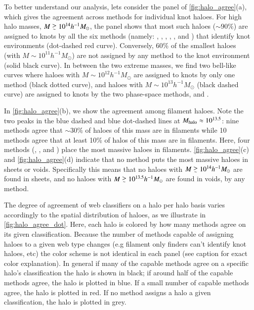 To better understand our analysis, lets consider the panel of \autoref{fig:halo_agree}(a), which gives the agreement across methods for individual knot haloes. For high halo masses, $M\gsim10^{14}h^{-1}M_{\odot}$, the panel shows that most such haloes ($\sim90\%$) are assigned to knots by all the six methods (namely: \nexus{}, \tweb{}, \vweb{}, \classic{}, \origami{}, and \mswa{}) that identify knot environments (dot-dashed red curve). Conversely, 60\% of the smallest haloes (with $M\sim10^{11}h^{-1}M_{\odot}$) are not assigned by any method to the knot environment (solid black curve). In between the two extreme masses, we find two bell-like curves where haloes with $M\sim10^{12}h^{-1}M_{\odot}$ are assigned to knots by only one method (black dotted curve), and haloes with $M\sim10^{13}h^{-1}M_{\odot}$ (black dashed curve) are assigned to knots by the two phase-space methods, \mswa{} and \origami{}.

In \autoref{fig:halo_agree}(b), we show the agreement among filament haloes. Note the two peaks in the blue dashed and blue dot-dashed lines at $M_{\rm halo}\approx 10^{13.5}$: nine methods agree that $\sim30\%$ of haloes of this mass are in filaments while 10 methods agree that at least 10\% of halos of this mass are in filaments. Here, four methods (\disperse{}, \spine{}, \mmft{} and \mst{}) place the most massive haloes in filaments. \autoref{fig:halo_agree}(c) and \autoref{fig:halo_agree}(d) indicate that no method puts the most massive haloes in sheets or voids. Specifically this means that no haloes with $M\gsim10^{14}h^{-1}M_{\odot}$ are found in sheets, and no haloes with $M\gsim10^{13.5}h^{-1}M_{\odot}$ are found in voids, by any method. 



The degree of agreement of web classifiers on a halo per halo basis varies accordingly to the spatial distribution of haloes, as we illustrate in \autoref{fig:halo_agree_dot}. Here, each halo is colored by how many methods agree on its given classification. Because the number of methods capable of assigning haloes to a given web type changes (e.g filament only finders can't identify knot haloes, etc) the color scheme is not identical in each panel (see caption for exact color explanation). In general if many of the capable methods agree on a specific halo's classification the halo is shown in black; if around half of the capable methods agree, the halo is plotted in blue. If a small number of capable methods agree, the halo is plotted in red. If no method assigns a halo a given classification, the halo is plotted in grey.

